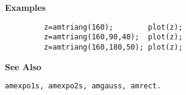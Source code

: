 {\bf \large {}\selectfont Examples}
\begin{verbatim}
         z=amtriang(160);        plot(z);
         z=amtriang(160,90,40);  plot(z);
         z=amtriang(160,180,50); plot(z);
\end{verbatim}
\vspace*{.5cm}


{\bf \large {}\selectfont See Also}\\
\hspace*{1.5cm}
\begin{minipage}[t]{13.5cm}
\begin{verbatim}
amexpo1s, amexpo2s, amgauss, amrect.
\end{verbatim}
\end{minipage}




